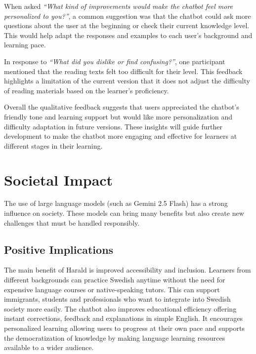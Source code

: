 \documentclass[a4paper,10pt]{article}
\begin{document}
When asked \textit{“What kind of improvements would make the chatbot feel more personalized to you?”}, a common suggestion was that the chatbot could ask more questions about the user at the beginning or check their current knowledge level. This would help adapt the responses and examples to each user’s background and learning pace.

In response to \textit{“What did you dislike or find confusing?”}, one participant mentioned that the reading texts felt too difficult for their level. This feedback highlights a limitation of the current version that it does not adjust the difficulty of reading materials based on the learner’s proficiency.

Overall the qualitative feedback suggests that users appreciated the chatbot’s friendly tone and learning support but would like more personalization and difficulty adaptation in future versions. These insights will guide further development to make the chatbot more engaging and effective for learners at different stages in their learning.

\section{Societal Impact}
The use of large language models (such as Gemini 2.5 Flash) has a strong influence on society. These models can bring many benefits but also create new challenges that must be handled responsibly.

\subsection{Positive Implications}
The main benefit of Harald is improved accessibility and inclusion. Learners from different backgrounds can practice Swedish anytime without the need for expensive language courses or native-speaking tutors. This can support immigrants, students and professionals who want to integrate into Swedish society more easily. The chatbot also improves educational efficiency offering instant corrections, feedback and explanations in simple English. It encourages personalized learning allowing users to progress at their own pace and supports the democratization of knowledge by making language learning resources available to a wider audience.
\end{document}

